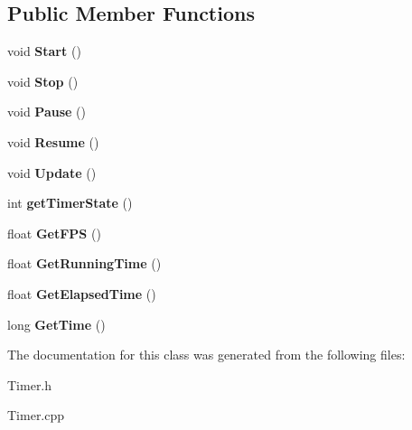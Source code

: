 \subsection*{Public Member Functions}
\begin{DoxyCompactItemize}
\item 
\hypertarget{class_timer_a4e607b129b392c11adddd9641a320436}{void {\bfseries Start} ()}\label{class_timer_a4e607b129b392c11adddd9641a320436}

\item 
\hypertarget{class_timer_a6379e797f968aaee6ac3bb12dc6b81c5}{void {\bfseries Stop} ()}\label{class_timer_a6379e797f968aaee6ac3bb12dc6b81c5}

\item 
\hypertarget{class_timer_a9b8c57bf9675da635a82d68d9b4d05e5}{void {\bfseries Pause} ()}\label{class_timer_a9b8c57bf9675da635a82d68d9b4d05e5}

\item 
\hypertarget{class_timer_ad3b4e386f8ebb885fa2ef6fcac8d9ca3}{void {\bfseries Resume} ()}\label{class_timer_ad3b4e386f8ebb885fa2ef6fcac8d9ca3}

\item 
\hypertarget{class_timer_a77a6595649759e7236d1b43c2c10e16b}{void {\bfseries Update} ()}\label{class_timer_a77a6595649759e7236d1b43c2c10e16b}

\item 
\hypertarget{class_timer_aa7094e07ab8ac40fb51988ba60a3ff2e}{int {\bfseries get\+Timer\+State} ()}\label{class_timer_aa7094e07ab8ac40fb51988ba60a3ff2e}

\item 
\hypertarget{class_timer_a8249a61233deb893722869fb1e17d3d4}{float {\bfseries Get\+F\+P\+S} ()}\label{class_timer_a8249a61233deb893722869fb1e17d3d4}

\item 
\hypertarget{class_timer_abfc1bd62379c2ebf476aedb727a2961a}{float {\bfseries Get\+Running\+Time} ()}\label{class_timer_abfc1bd62379c2ebf476aedb727a2961a}

\item 
\hypertarget{class_timer_a3ceb89ec06fe5d0a22c395121fe7c9c8}{float {\bfseries Get\+Elapsed\+Time} ()}\label{class_timer_a3ceb89ec06fe5d0a22c395121fe7c9c8}

\item 
\hypertarget{class_timer_ab23d65b973d595376c700ea607b13ed7}{long {\bfseries Get\+Time} ()}\label{class_timer_ab23d65b973d595376c700ea607b13ed7}

\end{DoxyCompactItemize}


The documentation for this class was generated from the following files\+:\begin{DoxyCompactItemize}
\item 
Timer.\+h\item 
Timer.\+cpp\end{DoxyCompactItemize}
